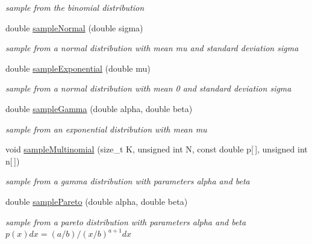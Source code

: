 \begin{DoxyCompactItemize}
\begin{DoxyCompactList}\small\item\em sample from the binomial distribution \end{DoxyCompactList}\item 
double \hyperlink{classrandomv_a574eadd80c9cc66756c3417e55f2655c}{sample\+Normal} (double sigma)
\begin{DoxyCompactList}\small\item\em sample from a normal distribution with mean mu and standard deviation sigma \end{DoxyCompactList}\item 
double \hyperlink{classrandomv_afa56a12aa1bb44d7d4bd2a84303d9dca}{sample\+Exponential} (double mu)
\begin{DoxyCompactList}\small\item\em sample from a normal distribution with mean 0 and standard deviation sigma \end{DoxyCompactList}\item 
\mbox{\label{classrandomv_a138a18fe2b991c0328510a7e077ca6a8}} 
double \hyperlink{classrandomv_a138a18fe2b991c0328510a7e077ca6a8}{sample\+Gamma} (double alpha, double beta)
\begin{DoxyCompactList}\small\item\em sample from an exponential distribution with mean mu \end{DoxyCompactList}\item 
\mbox{\label{classrandomv_ab840593c1344749631c73321f589370f}} 
void \hyperlink{classrandomv_ab840593c1344749631c73321f589370f}{sample\+Multinomial} (size\+\_\+t K, unsigned int N, const double p\mbox{[}$\,$\mbox{]}, unsigned int n\mbox{[}$\,$\mbox{]})
\begin{DoxyCompactList}\small\item\em sample from a gamma distribution with parameters alpha and beta \end{DoxyCompactList}\item 
\mbox{\label{classrandomv_a8973843ea2a27dc967333c712b89e788}} 
double \hyperlink{classrandomv_a8973843ea2a27dc967333c712b89e788}{sample\+Pareto} (double alpha, double beta)
\begin{DoxyCompactList}\small\item\em sample from a pareto distribution with parameters alpha and beta $p(x) dx = (a/b) / (x/b)^{a+1} dx$ \end{DoxyCompactList}\item 

\end{DoxyCompactItemize}
